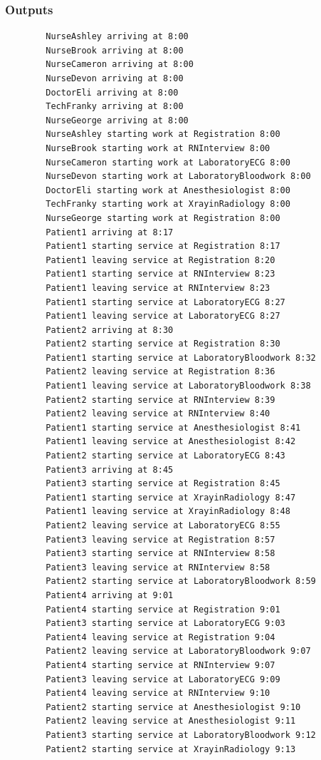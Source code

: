 \documentclass[12pt]{article}
\begin{document}
		\subsubsection{Outputs}
		\begin{verbatim}
		NurseAshley arriving at 8:00
		NurseBrook arriving at 8:00
		NurseCameron arriving at 8:00
		NurseDevon arriving at 8:00
		DoctorEli arriving at 8:00
		TechFranky arriving at 8:00
		NurseGeorge arriving at 8:00
		NurseAshley starting work at Registration 8:00
		NurseBrook starting work at RNInterview 8:00
		NurseCameron starting work at LaboratoryECG 8:00
		NurseDevon starting work at LaboratoryBloodwork 8:00
		DoctorEli starting work at Anesthesiologist 8:00
		TechFranky starting work at XrayinRadiology 8:00
		NurseGeorge starting work at Registration 8:00
		Patient1 arriving at 8:17
		Patient1 starting service at Registration 8:17
		Patient1 leaving service at Registration 8:20
		Patient1 starting service at RNInterview 8:23
		Patient1 leaving service at RNInterview 8:23
		Patient1 starting service at LaboratoryECG 8:27
		Patient1 leaving service at LaboratoryECG 8:27
		Patient2 arriving at 8:30
		Patient2 starting service at Registration 8:30
		Patient1 starting service at LaboratoryBloodwork 8:32
		Patient2 leaving service at Registration 8:36
		Patient1 leaving service at LaboratoryBloodwork 8:38
		Patient2 starting service at RNInterview 8:39
		Patient2 leaving service at RNInterview 8:40
		Patient1 starting service at Anesthesiologist 8:41
		Patient1 leaving service at Anesthesiologist 8:42
		Patient2 starting service at LaboratoryECG 8:43
		Patient3 arriving at 8:45
		Patient3 starting service at Registration 8:45
		Patient1 starting service at XrayinRadiology 8:47
		Patient1 leaving service at XrayinRadiology 8:48
		Patient2 leaving service at LaboratoryECG 8:55
		Patient3 leaving service at Registration 8:57
		Patient3 starting service at RNInterview 8:58
		Patient3 leaving service at RNInterview 8:58
		Patient2 starting service at LaboratoryBloodwork 8:59
		Patient4 arriving at 9:01
		Patient4 starting service at Registration 9:01
		Patient3 starting service at LaboratoryECG 9:03
		Patient4 leaving service at Registration 9:04
		Patient2 leaving service at LaboratoryBloodwork 9:07
		Patient4 starting service at RNInterview 9:07
		Patient3 leaving service at LaboratoryECG 9:09
		Patient4 leaving service at RNInterview 9:10
		Patient2 starting service at Anesthesiologist 9:10
		Patient2 leaving service at Anesthesiologist 9:11
		Patient3 starting service at LaboratoryBloodwork 9:12
		Patient2 starting service at XrayinRadiology 9:13

\end{verbatim}
\end{document}
